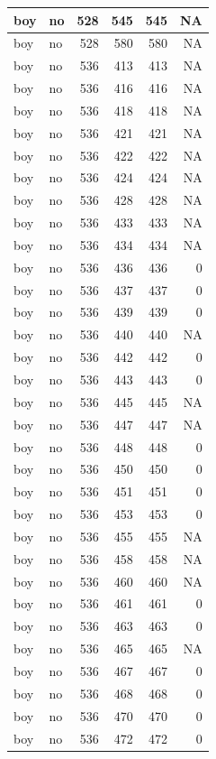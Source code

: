\documentclass[man]{apa6}
\begin{document}
\begin{tabular}{l|l|r|r|r|r}
\hline
boy & no & 528 & 545 & 545 & NA\\
\hline
boy & no & 528 & 580 & 580 & NA\\
\hline
boy & no & 536 & 413 & 413 & NA\\
\hline
boy & no & 536 & 416 & 416 & NA\\
\hline
boy & no & 536 & 418 & 418 & NA\\
\hline
boy & no & 536 & 421 & 421 & NA\\
\hline
boy & no & 536 & 422 & 422 & NA\\
\hline
boy & no & 536 & 424 & 424 & NA\\
\hline
boy & no & 536 & 428 & 428 & NA\\
\hline
boy & no & 536 & 433 & 433 & NA\\
\hline
boy & no & 536 & 434 & 434 & NA\\
\hline
boy & no & 536 & 436 & 436 & 0\\
\hline
boy & no & 536 & 437 & 437 & 0\\
\hline
boy & no & 536 & 439 & 439 & 0\\
\hline
boy & no & 536 & 440 & 440 & NA\\
\hline
boy & no & 536 & 442 & 442 & 0\\
\hline
boy & no & 536 & 443 & 443 & 0\\
\hline
boy & no & 536 & 445 & 445 & NA\\
\hline
boy & no & 536 & 447 & 447 & NA\\
\hline
boy & no & 536 & 448 & 448 & 0\\
\hline
boy & no & 536 & 450 & 450 & 0\\
\hline
boy & no & 536 & 451 & 451 & 0\\
\hline
boy & no & 536 & 453 & 453 & 0\\
\hline
boy & no & 536 & 455 & 455 & NA\\
\hline
boy & no & 536 & 458 & 458 & NA\\
\hline
boy & no & 536 & 460 & 460 & NA\\
\hline
boy & no & 536 & 461 & 461 & 0\\
\hline
boy & no & 536 & 463 & 463 & 0\\
\hline
boy & no & 536 & 465 & 465 & NA\\
\hline
boy & no & 536 & 467 & 467 & 0\\
\hline
boy & no & 536 & 468 & 468 & 0\\
\hline
boy & no & 536 & 470 & 470 & 0\\
\hline
boy & no & 536 & 472 & 472 & 0\\

\end{tabular}
\end{document}
